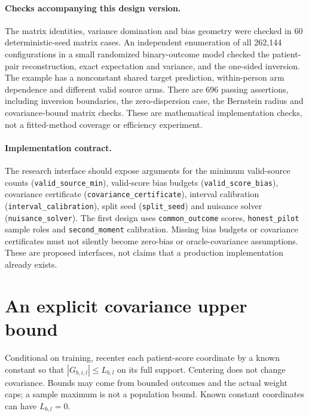 \paragraph{Checks accompanying this design version.}
The matrix identities, variance domination and bias geometry were checked in
60 deterministic-seed matrix cases. An independent enumeration of all
262,144 configurations in a small randomized binary-outcome model checked
the patient-pair reconstruction, exact expectation and variance, and the
one-sided inversion. The example has a nonconstant shared target prediction,
within-person arm dependence and different valid source arms. There are
696 passing assertions, including inversion boundaries, the zero-dispersion
case, the Bernstein radius and covariance-bound matrix checks. These are
mathematical implementation checks, not a
fitted-method coverage or efficiency experiment.

\paragraph{Implementation contract.}
The research interface should expose arguments for the minimum valid-source
counts (\texttt{valid\_source\_min}), valid-score bias budgets
(\texttt{valid\_score\_bias}), covariance certificate
(\texttt{covariance\_certificate}), interval calibration
(\texttt{interval\_calibration}), split seed (\texttt{split\_seed})
and nuisance solver (\texttt{nuisance\_solver}).
The first design uses \texttt{common\_outcome} scores,
\texttt{honest\_pilot} sample roles and \texttt{second\_moment} calibration.
Missing bias budgets or covariance certificates must not silently become
zero-bias or oracle-covariance assumptions. These are proposed interfaces,
not claims that a production implementation already exists.

\appendix
\section{An explicit covariance upper bound}\label{app:covariance}

Conditional on training, recenter each patient-score coordinate by a known
constant so that $|G_{b,i,l}|\le L_{b,l}$ on its full support. Centering does
not change covariance. Bounds may come from bounded outcomes and the actual
weight caps; a sample maximum is not a population bound. Known constant
coordinates can have $L_{b,l}=0$.

